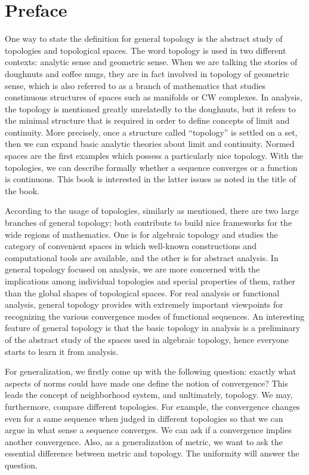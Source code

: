 

\chapter*{Preface}

%


One way to state the definition for general topology is the abstract study of topologies and topological spaces.
The word topology is used in two different contexts: analytic sense and geometric sense.
When we are talking the stories of doughnuts and coffee mugs, they are in fact involved in topology of geometric sense, which is also referred to as a branch of mathematics that studies constinuous structures of spaces such as manifolds or CW complexes.
In analysis, the topology is mentioned greatly unrelatedly to the doughnuts, but it refers to the minimal structure that is required in order to define concepts of limit and continuity.
More precisely, once a structure called ``topology'' is settled on a set, then we can expand basic analytic theories about limit and continuity.
Normed spaces are the first examples which possess a particularly nice topology.
With the topologies, we can describe formally whether a sequence converges or a function is continuous.
This book is interested in the latter issues as noted in the title of the book.

According to the usage of topologies, similarly as mentioned, there are two large branches of general topology; both contribute to build nice frameworks for the wide regions of mathematics.
One is for algebraic topology and studies the category of convenient spaces in which well-known constructions and computational tools are available, and the other is for abstract analysis.
In general topology focused on analysis, we are more concerned with the implications among individual topologies and special properties of them, rather than the global shapes of topological spaces.
For real analysis or functional analysis, general topology provides with extremely important viewpoints for recognizing the various convergence modes of functional sequences.
An interesting feature of general topology is that the basic topology in analysis is a preliminary of the abstract study of the spaces used in algebraic topology, hence everyone starts to learn it from analysis.

\iffalse
For generalization, we firstly come up with the following question: exactly what aspects of norms could have made one define the notion of convergence?
This leads the concept of neighborhood system, and unltimately, topology.
We may, furthermore, compare different topologies.
For example, the convergence changes even for a same sequence when judged in different topologies so that we can argue in what sense a sequence converges.
We can ask if a convergence implies another convergence.
Also, as a generalization of metric, we want to ask the essential difference between metric and topology.
The uniformity will answer the question.

